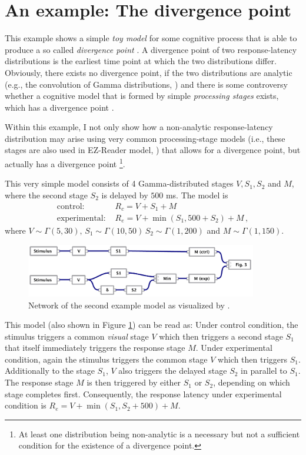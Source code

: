 \section{An example: The divergence point} \label{sec:pod}
This example shows a simple \emph{toy model} for some cognitive process that is able to produce a
so called \emph{divergence point} \cite[e.g.,][]{Reingold2012}. A divergence point of two response-latency
distributions is the earliest time point at which the two distributions differ. Obviously, 
there exists no divergence point, if the two distributions are analytic 
(e.g., the convolution of Gamma distributions, \cite{Mathai1982}) and there is some controversy
whether a cognitive model that is formed by simple \emph{processing stages} exists, which has a
divergence point \cite[e.g.,][]{Gomez2016}.

Within this example, I not only show how a non-analytic response-latency distribution may arise
using very common processing-stage models (i.e., these stages are also used in EZ-Reader model,
\cite{Reichle2003}) that allows for a divergence point, but actually has a divergence point%
\footnote{At least one distribution being non-analytic is a necessary but not a sufficient
condition for the existence of a divergence point.}. 

This very simple model consists of 4 Gamma-distributed stages $V, S_1, S_2$ and $M$,
where the second stage $S_2$ is delayed by $500$ ms. 
The model is
\begin{align}
 \text{control: } & R_c = V + S_1 + M \\
 \text{experimental: } & R_e = V + \min(S_1, 500+S_2) + M\,,
\end{align}
where $V \sim \Gamma(5,30),\,S_1\sim\Gamma(10,50)\,S_2\sim\Gamma(1,200)$ and $M\sim\Gamma(1,150)$.
\begin{figure}[!ht]
 \centering
 \includegraphics[width=0.9\textwidth]{fig/example2.pdf}
 \caption{Network of the second example model as visualized by .} \label{fig:example2}
\end{figure}

This model (also shown in Figure \ref{fig:example2}) can be read as: Under control condition, the
stimulus triggers a common \emph{visual} stage $V$ which then triggers a second stage $S_1$ that
itself immediately triggers the response stage $M$. Under experimental condition, again the
stimulus triggers the common stage $V$ which then triggers $S_1$. Additionally to the stage $S_1$,
$V$ also triggers the delayed stage $S_2$ in parallel to $S_1$. The response stage $M$ is then triggered by 
either $S_1$ or $S_2$, depending on which stage completes first. Consequently, the response latency
under experimental condition is $R_e = V + \min(S_1,S_2+500) + M$.

